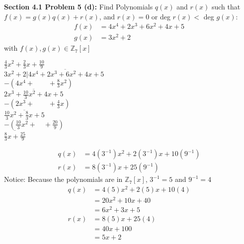 \documentclass[12pt]{article}
\begin{document}
\noindent \textbf{Section 4.1 Problem 5 (d): }Find Polynomials $q(x)$ and $r(x)$ such that $f(x) = g(x)q(x) + r(x)$, and $r(x) = 0$ or deg $r(x) <$ deg $g(x)$:
	\begin{align*}
		f(x) &= 4x^4 + 2x^3 + 6x^2 + 4x + 5 \\
		g(x) &= 3x^2 + 2
	\end{align*}
	with $f(x), g(x) \in \mathbb{Z}_7[x]$
	\\ 
	\begin{center} 
	\text{} \qquad \qquad \qquad \qquad $\frac{4}{3}x^2 + \frac{2}{3}x + \frac{10}{9}$ \\ 
	$3x^2 + 2 \overline{|4x^4 + 2x^3 + 6x^2 + 4x + 5}$ \\ 
	\text{} \qquad $-(4x^4 + \qquad + \frac{8}{3}x^2)$ \\ 
	\text{}\qquad \qquad \qquad $\overline{2x^3 + \frac{10}{3}x^2 + 4x + 5}$ \\ 
	\text{}\qquad \qquad \quad $-(2x^3 + \qquad + \frac{4}{3}x)$ \\ 
	\text{}\qquad \qquad \qquad \qquad \quad $\overline{\frac{10}{3}x^2 + \frac{8}{3}x + 5}$  \\ 
	\text{}\qquad \qquad \qquad \qquad $-(\frac{10}{3}x^2 + \quad + \frac{20}{9})$ \\ 
	\text{}\qquad \qquad \qquad \qquad \qquad \qquad $\overline{\frac{8}{3}x + \frac{25}{9}}$ 
	\end{center}
	\begin{align*}
		q(x) &= 4(3^{-1})x^2 + 2(3^{-1})x + 10(9^{-1}) \\
		r(x) &= 8(3^{-1})x + 25(9^{-1})
	\end{align*}
	Notice: Because the polynomials are in $\mathbb{Z}_7[x]$, $3^{-1} = 5$ and $9^{-1} = 4$
	\begin{align*}
	q(x) &= 4(5)x^2 + 2(5)x + 10(4) \\
	&= 20x^2 + 10x + 40 \\
	&= 6x^2 + 3x + 5 \\
	r(x) &= 8(5)x + 25(4) \\
	&= 40x + 100 \\
	&= 5x + 2
	\end{align*}

\newpage 
\end{document}
